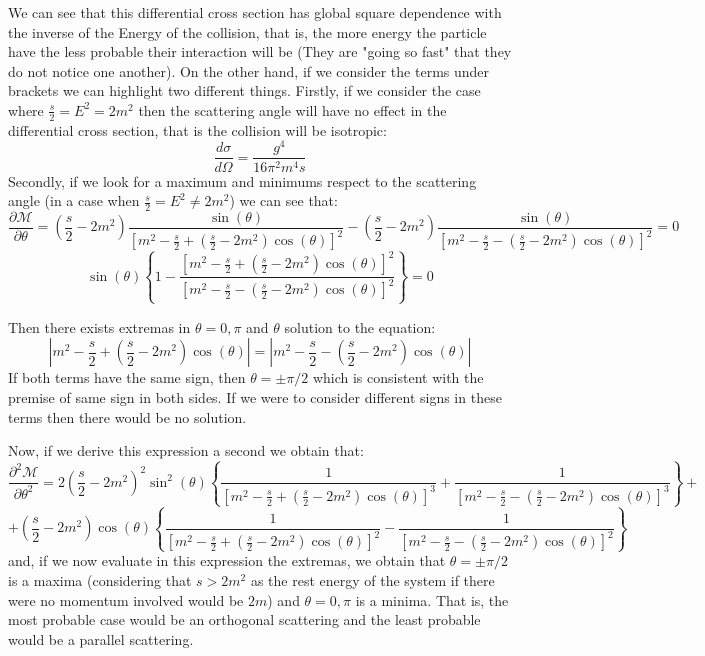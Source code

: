 \documentclass[12pt]{article}
\begin{document}
We can see that this differential cross section has global square dependence with the inverse of the Energy of the collision, that is, the more energy the particle have the less probable their interaction will be (They are "going so fast" that they do not notice one another). On the other hand, if we consider the terms under brackets we can highlight two different things. Firstly, if we consider the case where $\frac{s}{2}= E^2 =2m^2$ then the scattering angle will have no effect in the differential cross section, that is the collision will be isotropic:
\[
    \frac{d\sigma}{d\Omega}= \frac{g^4}{16\pi^2m^4s}
\]
Secondly, if we look for a maximum and minimums respect to the scattering angle (in a case when $\frac{s}{2}= E^2 \neq 2m^2$) we can see that:
\[
    \frac{\partial\mathcal{M}}{\partial\theta} = \left(\frac{s}{2}-2m^2\right)\frac{\sin(\theta)}{\left[m^2-\frac{s}{2}+(\frac{s}{2}-2m^2)\cos(\theta)\right]^2}-\left(\frac{s}{2}-2m^2\right)\frac{\sin(\theta)}{\left[m^2-\frac{s}{2}-(\frac{s}{2}-2m^2)\cos(\theta)\right]^2}=0
\]
\[
    \sin(\theta)\left\{1-\frac{\left[m^2-\frac{s}{2}+(\frac{s}{2}-2m^2)\cos(\theta)\right]^2}{\left[m^2-\frac{s}{2}-(\frac{s}{2}-2m^2)\cos(\theta)\right]^2}\right\} = 0
\]

Then there exists extremas in $\theta=0,\pi$ and $\theta$ solution to the equation:
\[
    \left|m^2-\frac{s}{2}+\left(\frac{s}{2}-2m^2\right)\cos(\theta)\right| = \left|m^2-\frac{s}{2}-\left(\frac{s}{2}-2m^2\right)\cos(\theta)\right|
\]
If both terms have the same sign, then $\theta=\pm \pi/2$ which is consistent with the premise of same sign in both sides. If we were to consider different signs in these terms then there would be no solution.

\vspace{.25cm}

Now, if we derive this expression a second we obtain that:
\[
    \frac{\partial^2\mathcal{M}}{\partial\theta^2} = 2\left(\frac{s}{2}-2m^2\right)^2\sin^2(\theta)\left\{\frac{1}{\left[m^2-\frac{s}{2}+(\frac{s}{2}-2m^2)\cos(\theta)\right]^3}+\frac{1}{\left[m^2-\frac{s}{2}-(\frac{s}{2}-2m^2)\cos(\theta)\right]^3}\right\} +
\]
\[
    + \left(\frac{s}{2}-2m^2\right)\cos(\theta)\left\{\frac{1}{\left[m^2-\frac{s}{2}+(\frac{s}{2}-2m^2)\cos(\theta)\right]^2}-\frac{1}{\left[m^2-\frac{s}{2}-(\frac{s}{2}-2m^2)\cos(\theta)\right]^2}\right\}
\]
and, if we now evaluate in this expression the extremas, we obtain that $\theta = \pm \pi/2$ is a maxima (considering that $s>2m^2$ as the rest energy of the system if there were no momentum involved would be $2m$) and $\theta = 0, \pi$ is a minima. That is, the most probable case would be an orthogonal scattering and the least probable would be a parallel scattering.
\end{document}
